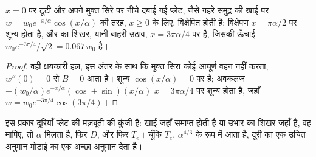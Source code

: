 \begin{proposition}[टूटी हुई प्लेट]\label{prop:b3:gravity-geodesy:broken}
$x = 0$ पर टूटी और अपने मुक्त सिरे पर नीचे दबाई गई प्लेट, जैसे गहरे समुद्र की
खाई पर $w = w_0e^{-x/\alpha}\cos(x/\alpha)$ की तरह, $x \ge 0$ के लिए, विक्षेपित होती है:
विक्षेपण $x = \pi\alpha/2$ पर शून्य होता है, और  का शिखर, यानी बाहरी उठाव,
$x = 3\pi\alpha/4$ पर है, जिसकी ऊँचाई $w_0e^{-3\pi/4}/\sqrt2 =
\num{0.067}\,w_0$ है।
\end{proposition}

\begin{proof}
वही क्षयकारी हल, इस अंतर के साथ कि मुक्त सिरा कोई आघूर्ण वहन नहीं करता,
$w''(0) = 0$ से $B = 0$ आता है। शून्य $\cos(x/\alpha) = 0$ पर है; अवकलज
$-(w_0/\alpha)e^{-x/\alpha}(\cos + \sin)(x/\alpha)$ $x = 3\pi\alpha/4$ पर शून्य होता है,
जहाँ $w = w_0e^{-3\pi/4}\cos(3\pi/4)$।
\end{proof}

इस प्रकार दूरियाँ प्लेट की मज़बूती की कुंजी हैं: खाई जहाँ समाप्त होती है
या उभार का शिखर जहाँ है, वह मापिए, तो $\alpha$ मिलता है, फिर $D$, और फिर $T_e$।
चूँकि $T_e$, $\alpha^{4/3}$ के रूप में आता है, दूरी का एक उचित अनुमान
मोटाई का एक अच्छा अनुमान देता है।

